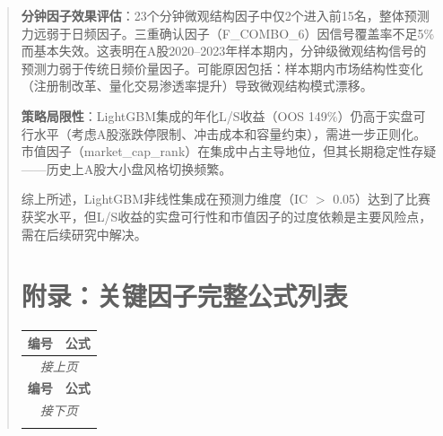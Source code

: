 \documentclass[12pt,a4paper]{article}
\begin{document}
\begin{abstract}
\textbf{分钟因子效果评估}：23个分钟微观结构因子中仅2个进入前15名，整体预测力远弱于日频因子。三重确认因子（F\_COMBO\_6）因信号覆盖率不足5\%而基本失效。这表明在A股2020--2023年样本期内，分钟级微观结构信号的预测力弱于传统日频价量因子。可能原因包括：样本期内市场结构性变化（注册制改革、量化交易渗透率提升）导致微观结构模式漂移。

\textbf{策略局限性}：LightGBM集成的年化L/S收益（OOS 149\%）仍高于实盘可行水平（考虑A股涨跌停限制、冲击成本和容量约束），需进一步正则化。市值因子（market\_cap\_rank）在集成中占主导地位，但其长期稳定性存疑——历史上A股大小盘风格切换频繁。

综上所述，LightGBM非线性集成在预测力维度（IC $>$ 0.05）达到了比赛获奖水平，但L/S收益的实盘可行性和市值因子的过度依赖是主要风险点，需在后续研究中解决。

\appendix
\section{附录：关键因子完整公式列表}

\begin{longtable}{ll}
\toprule
\textbf{编号} & \textbf{公式} \\
\midrule
\endfirsthead
\multicolumn{2}{c}{\textit{接上页}} \\
\toprule
\textbf{编号} & \textbf{公式} \\
\midrule
\endhead
\midrule
\multicolumn{2}{c}{\textit{接下页}} \\
\endfoot
\bottomrule
\endlastfoot


\end{longtable}
\end{abstract}
\end{document}
